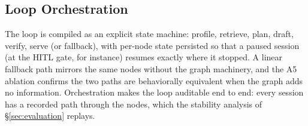 \subsection{Loop Orchestration}
\label{sec:orchestration}
The loop is compiled as an explicit state machine: profile, retrieve,
plan, draft, verify, serve (or fallback), with per-node state persisted so
that a paused session (at the HITL gate, for instance) resumes exactly
where it stopped. A linear fallback path mirrors the same nodes without
the graph machinery, and the A5 ablation confirms the two paths are
behaviorally equivalent when the graph adds no information. Orchestration
makes the loop auditable end to end: every session has a recorded
path through the nodes, which the stability analysis of
\S\ref{sec:evaluation} replays.
